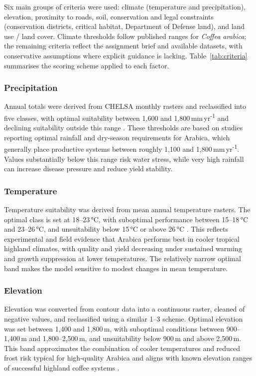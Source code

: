 \documentclass[12pt,a4paper]{article}
\begin{document}
Six main groups of criteria were used: climate (temperature and precipitation), elevation, proximity to roads, soil, conservation and legal constraints (conservation districts, critical habitat, Department of Defense land), and land use / land cover. Climate thresholds follow published ranges for \textit{Coffea arabica}; the remaining criteria reflect the assignment brief and available datasets, with conservative assumptions where explicit guidance is lacking. Table~\ref{tab:criteria} summarises the scoring scheme applied to each factor.

\subsubsection{Precipitation}

Annual totals were derived from CHELSA monthly rasters and reclassified into five classes, with optimal suitability between 1{,}600 and 1{,}800\,mm\,yr\textsuperscript{-1} and declining suitability outside this range \citep{DaMatta2006}. These thresholds are based on studies reporting optimal rainfall and dry-season requirements for Arabica, which generally place productive systems between roughly 1{,}100 and 1{,}800\,mm\,yr\textsuperscript{-1}. Values substantially below this range risk water stress, while very high rainfall can increase disease pressure and reduce yield stability.

\subsubsection{Temperature}

Temperature suitability was derived from mean annual temperature rasters. The optimal class is set at 18--23\,°C, with suboptimal performance between 15--18\,°C and 23--26\,°C, and unsuitability below 15\,°C or above 26\,°C \citep{DaMatta2006}. This reflects experimental and field evidence that Arabica performs best in cooler tropical highland climates, with quality and yield decreasing under sustained warming and growth suppression at lower temperatures. The relatively narrow optimal band makes the model sensitive to modest changes in mean temperature.

\subsubsection{Elevation}

Elevation was converted from contour data into a continuous raster, cleaned of negative values, and reclassified using a similar 1--3 scheme. Optimal elevation was set between 1{,}400 and 1{,}800\,m, with suboptimal conditions between 900--1{,}400\,m and 1{,}800--2{,}500\,m, and unsuitability below 900\,m and above 2{,}500\,m. This band approximates the combination of cooler temperatures and reduced frost risk typical for high-quality Arabica and aligns with known elevation ranges of successful highland coffee systems \citep{Liu2025}.
\end{document}
